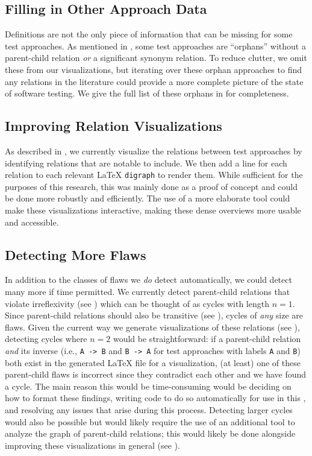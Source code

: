 \subsection{Filling in Other Approach Data}\label{future-app-data}
Definitions are not the only piece of information that can be missing for some
test approaches. As mentioned in , some test approaches are
``orphans'' without a parent-child relation \emph{or} a significant synonym
relation. To reduce clutter, we omit these from our visualizations, but
iterating over these orphan approaches to find any relations in the literature
could provide a more complete picture of the state of software testing.%
 We give the
full list of these orphans in  for completeness.

\subsection{Improving Relation Visualizations}\label{future-rel-vis}
As described in , we currently visualize the relations
between test approaches by identifying relations that are notable to include.
We then add a line for each relation to each relevant \LaTeX{}
\texttt{digraph} to render them. While sufficient for the purposes of this
research, this was mainly done as a proof of concept and
could be done more robustly and efficiently. The use of a more elaborate tool
could make these visualizations interactive, making these dense overviews more
usable and accessible.

\subsection{Detecting More Flaws}\label{future-detect-flaws}
In addition to the classes of flaws we \emph{do} detect automatically, we could
detect many more if time permitted. We currently detect parent-child relations
that violate irreflexivity (see ) which can be thought of as
cycles with length $n=1$. Since parent-child relations should also be
transitive (see ), cycles of \emph{any} size are flaws.
Given the current way we generate visualizations of these relations (see
), detecting cycles where $n=2$ would be straightforward: if
a parent-child relation \emph{and} its inverse (i.e., \texttt{A~->~B} and
\texttt{B~->~A} for test approaches with labels \texttt{A} and \texttt{B}) both
exist in the generated \LaTeX{} file for a visualization, (at least) one of
these parent-child flaws is incorrect since they contradict each other and we
have found a cycle. The main reason this would be time-consuming would be
deciding on how to format these findings, writing code to do so automatically
for use in this \docType{}, and resolving any issues that arise during this
process. Detecting larger cycles would also be possible but would likely
require the use of an additional tool to analyze the graph of parent-child
relations; this would likely be done alongside improving these visualizations
in general (see ).

